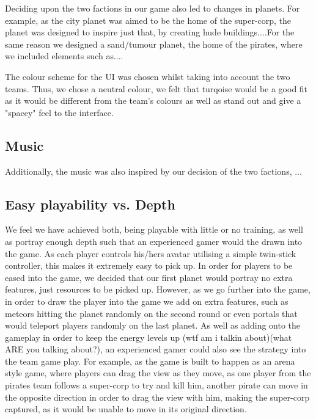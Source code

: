 \documentclass[11pt,a4paper]{article}
\begin{document}
        Deciding upon the two factions in our game also led to changes in planets. For example, as the city planet was aimed to be the home of the super-corp, the planet was designed to inspire just that, by creating hude buildings....For the same reason we designed a sand/tumour planet, the home of the pirates, where we included elements such as....

        The colour scheme for the UI was chosen whilst taking into account the two teams. Thus, we chose a neutral colour, we felt that turqoise would be a good fit as it would be different from the team's colours as well as stand out and give a "spacey" feel to the interface.


        \subsection{Music}
        Additionally, the music was also inspired by our decision of the two factions, ...


        \subsection{Easy playability vs. Depth}
        We feel we have achieved both, being playable with little or no training, as well as portray enough depth such that an experienced gamer would the drawn into the game. As each player controls his/hers avatar utilising a simple twin-stick controller, this makes it extremely easy to pick up. In order for players to be eased into the game, we decided that our first planet would portray no extra features, just resources to be picked up. However, as we go further into the game, in order to draw the player into the game we add on extra features, such as meteors hitting the planet randomly on the second round or even portals that would teleport players randomly on the last planet. As well as adding onto the gameplay in order to keep the energy levels up (wtf am i talkin about)(what ARE you talking about?), an experienced gamer could also see the strategy into the team game play. For example, as the game is built to happen as an arena style game, where players can drag the view as they move, as one player from the pirates team follows a super-corp to try and kill him, another pirate can move in the opposite direction in order to drag the view with him, making the super-corp captured, as it would be unable to move in its original direction. 
\end{document}
